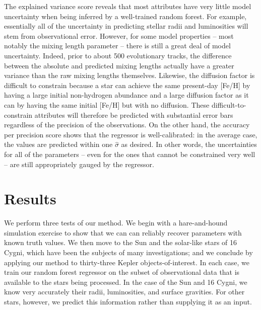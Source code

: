 \documentclass[iop,apj,twocolappendix]{emulateapj}
\begin{document}
The explained variance score reveals that most attributes have very little model uncertainty when being inferred by a well-trained random forest. For example, essentially all of the uncertainty in predicting stellar radii and luminosities will stem from observational error. However, for some model properties -- most notably the mixing length parameter -- there is still a great deal of model uncertainty. Indeed, prior to about 500 evolutionary tracks, the difference between the absolute and predicted mixing lengths actually have a greater variance than the raw mixing lengths themselves. Likewise, the diffusion factor is difficult to constrain because a star can achieve the same present-day [Fe/H] by having a large initial non-hydrogen abundance and a large diffusion factor as it can by having the same initial [Fe/H] but with no diffusion. These difficult-to-constrain attributes will therefore be predicted with substantial error bars regardless of the precision of the observations. On the other hand, the accuracy per precision score shows that the regressor is well-calibrated: in the average case, the values are predicted within one $\hat\sigma$ as desired. In other words, the uncertainties for all of the parameters -- even for the ones that cannot be constrained very well -- are still appropriately gauged by the regressor. 


\section{Results}
We perform three tests of our method. We begin with a hare-and-hound simulation exercise to show that we can can reliably recover parameters with known truth values. We then move to the Sun and the solar-like stars of 16 Cygni, which have been the subjects of many investigations; and we conclude by applying our method to thirty-three Kepler objects-of-interest. In each case, we train our random forest regressor on the subset of observational data that is available to the stars being processed. In the case of the Sun and 16 Cygni, we know very accurately their radii, luminosities, and surface gravities. For other stars, however, we predict this information rather than supplying it as an input. 


\end{document}

